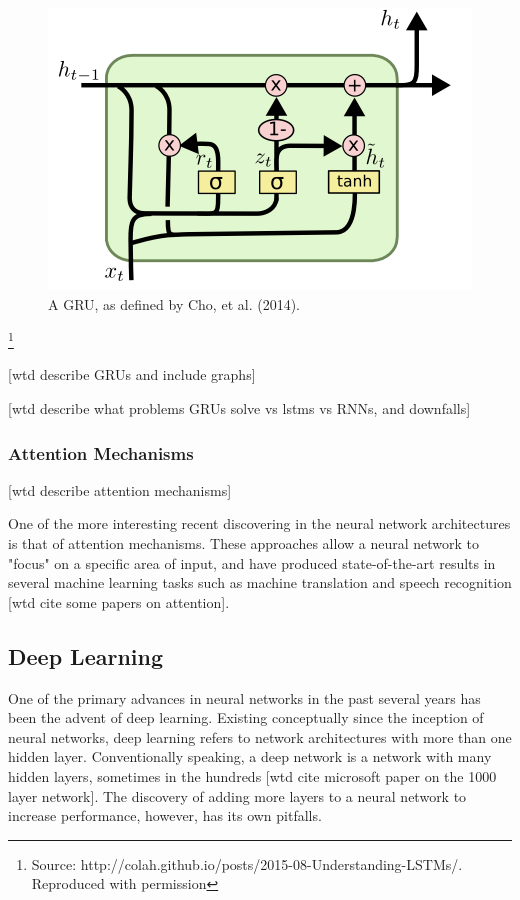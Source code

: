\begin{figure}[h]
    \centering
	\includegraphics[width=.8\textwidth]{./images/illustrations/GRU}
    \caption{A GRU, as defined by Cho, et al. (2014).}
    \label{fig:mesh1}
\end{figure}\footnote{Source: http://colah.github.io/posts/2015-08-Understanding-LSTMs/. Reproduced with permission}



[wtd describe GRUs and include graphs]

[wtd describe what problems GRUs solve vs lstms vs RNNs, and downfalls]

\subsubsection{Attention Mechanisms}

[wtd describe attention mechanisms]

One of the more interesting recent discovering in the neural network architectures is that of attention mechanisms.  These approaches allow a neural network to "focus" on a specific area of input, and have produced state-of-the-art results in several machine learning tasks such as machine translation and speech recognition [wtd cite some papers on attention].

\subsection{Deep Learning}

One of the primary advances in neural networks in the past several years has been the advent of deep learning.  Existing conceptually since the inception of neural networks, deep learning refers to network architectures with more than one hidden layer.  Conventionally speaking, a deep network is a network with many hidden layers, sometimes in the hundreds [wtd cite microsoft paper on the 1000 layer network].  The discovery of adding more layers to a neural network to increase performance, however, has its own pitfalls.

